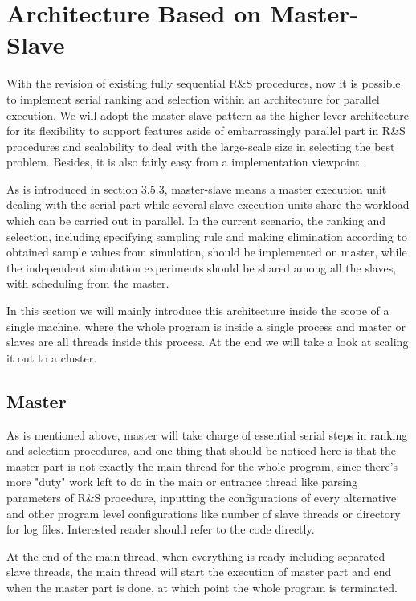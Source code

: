 \documentclass[12pt,a4paper]{report}
\begin{document}
\section{Architecture Based on Master-Slave}

With the revision of existing fully sequential R\&S procedures, now it is possible to implement serial ranking and selection within an architecture for parallel execution. We will adopt the master-slave pattern as the higher lever architecture for its flexibility to support features aside of embarrassingly parallel part in R\&S procedures and scalability to deal with the large-scale size in selecting the best problem. Besides, it is also fairly easy from a implementation viewpoint.

As is introduced in section 3.5.3, master-slave means a master execution unit dealing with the serial part while several slave execution units share the workload which can be carried out in parallel. In the current scenario, the ranking and selection, including specifying sampling rule and making elimination according to obtained sample values from simulation, should be implemented on master, while the independent simulation experiments should be shared among all the slaves, with scheduling from the master.

In this section we will mainly introduce this architecture inside the scope of a single machine, where the whole program is inside a single process and master or slaves are all threads inside this process. At the end we will take a look at scaling it out to a cluster.

\subsection{Master}

As is mentioned above, master will take charge of essential serial steps in ranking and selection procedures, and one thing that should be noticed here is that the master part is not exactly the main thread for the whole program, since there's more "duty" work left to do in the main or entrance thread like parsing parameters of R\&S procedure, inputting the configurations of every alternative and other program level configurations like number of slave threads or directory for log files. Interested reader should refer to the code directly.

At the end of the main thread, when everything is ready including separated slave threads, the main thread will start the execution of master part and end when the master part is done, at which point the whole program is terminated.
\end{document}
